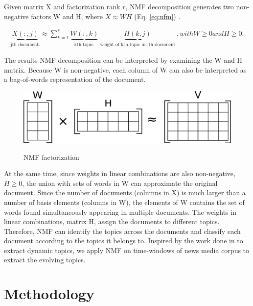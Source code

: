 Given matrix X and factorization rank $r$, NMF decomposition generates two non-negative factors W and H, where $X \approx W H$ (Eq. \ref{eq:nfm}) \cite{Lee1999}. 

\begin{multline}\label{eq:nfm}
\underbrace{X(:,j)}_\text{jth document.} \approx \sum_{k=1}^{r} \underbrace{W(:,k)}_\text{kth topic.} \underbrace{H(k,j)}_\text{ weight of kth topic in jth document.} , 
with W \geq 0 and H \geq 0.
\end{multline}

The results NMF decomposition can be interpreted by examining the W and H matrix. Because W is non-negative, each column of W can also be interpreted as a bag-of-words representation of the document.

\begin{figure}[ht]
\centering
\includegraphics[scale=.7]{img/NMF}
\label{fig:NMF}
\caption{NMF factorization}
\end{figure}

 At the same time, since weights in linear combinations are also non-negative, $H \geq 0$, the union with sets of words in W can approximate the original document. Since the number of documents (columns in X) is much larger than a number of basis elements (columns in W), the elements of W contains the set of words found simultaneously appearing in multiple documents. The weights in linear combinations, matrix H, assign the documents to different topics. Therefore, NMF  can identify the topics across the documents and classify each document according to the topics it belongs to. Inspired by the work done in \cite{Greene2016} to extract dynamic topics, we apply NMF on time-windows of news media corpus to extract the evolving topics. 
 
 
\section{Methodology}

